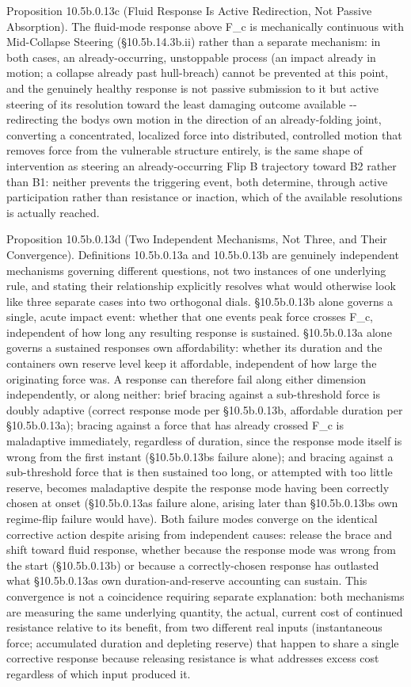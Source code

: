 \documentclass[
]{article}
\begin{document}
Proposition 10.5b.0.13c (Fluid Response Is Active Redirection, Not
Passive Absorption). The fluid-mode response above F\_c is mechanically
continuous with Mid-Collapse Steering (§10.5b.14.3b.ii) rather than a
separate mechanism: in both cases, an already-occurring, unstoppable
process (an impact already in motion; a collapse already past
hull-breach) cannot be prevented at this point, and the genuinely
healthy response is not passive submission to it but active steering of
its resolution toward the least damaging outcome available -\/-
redirecting the bodys own motion in the direction of an already-folding
joint, converting a concentrated, localized force into distributed,
controlled motion that removes force from the vulnerable structure
entirely, is the same shape of intervention as steering an
already-occurring Flip B trajectory toward B2 rather than B1: neither
prevents the triggering event, both determine, through active
participation rather than resistance or inaction, which of the available
resolutions is actually reached.

Proposition 10.5b.0.13d (Two Independent Mechanisms, Not Three, and
Their Convergence). Definitions 10.5b.0.13a and 10.5b.0.13b are
genuinely independent mechanisms governing different questions, not two
instances of one underlying rule, and stating their relationship
explicitly resolves what would otherwise look like three separate cases
into two orthogonal dials. §10.5b.0.13b alone governs a single, acute
impact event: whether that one events peak force crosses F\_c,
independent of how long any resulting response is sustained.
§10.5b.0.13a alone governs a sustained responses own affordability:
whether its duration and the containers own reserve level keep it
affordable, independent of how large the originating force was. A
response can therefore fail along either dimension independently, or
along neither: brief bracing against a sub-threshold force is doubly
adaptive (correct response mode per §10.5b.0.13b, affordable duration
per §10.5b.0.13a); bracing against a force that has already crossed F\_c
is maladaptive immediately, regardless of duration, since the response
mode itself is wrong from the first instant (§10.5b.0.13bs failure
alone); and bracing against a sub-threshold force that is then sustained
too long, or attempted with too little reserve, becomes maladaptive
despite the response mode having been correctly chosen at onset
(§10.5b.0.13as failure alone, arising later than §10.5b.0.13bs own
regime-flip failure would have). Both failure modes converge on the
identical corrective action despite arising from independent causes:
release the brace and shift toward fluid response, whether because the
response mode was wrong from the start (§10.5b.0.13b) or because a
correctly-chosen response has outlasted what §10.5b.0.13as own
duration-and-reserve accounting can sustain. This convergence is not a
coincidence requiring separate explanation: both mechanisms are
measuring the same underlying quantity, the actual, current cost of
continued resistance relative to its benefit, from two different real
inputs (instantaneous force; accumulated duration and depleting reserve)
that happen to share a single corrective response because releasing
resistance is what addresses excess cost regardless of which input
produced it.
\end{document}
